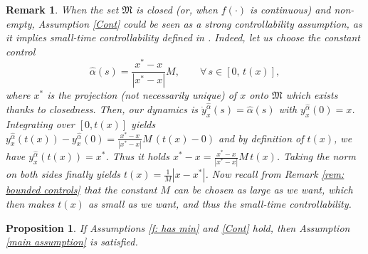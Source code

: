 \documentclass[12pt]{amsart}
\numberwithin{equation}{section}
\theoremstyle{plain}
\newtheorem{proposition}[theorem]{Proposition}
\newtheorem{remark}[theorem]{Remark}
\begin{document}
\begin{remark}\label{rem: stc}
When the set $\mathfrak{M}$ is closed (or, when $f(\cdot)$ is continuous) and non-empty, 
Assumption \ref{Cont} could be seen as a strong controllability assumption, as it implies \textit{small-time controllability} defined in \cite[Definition IV.1.1]{bardi1997optimal}. Indeed, let us choose the constant control  
\begin{equation}\label{alpha hat}
    \hat{\alpha}(s) = \frac{x^{*} - x}{|x^{*} - x|}M, \quad \quad \forall\, s\in [0, \, t(x)],
\end{equation}
where $x^{*}$ is the projection (not necessarily unique) of $x$ onto $\mathfrak{M}$ which exists thanks to closedness. Then, our dynamics is $\dot{y}_{x}^{\hat{\alpha}}(s) = \hat{\alpha}(s)$ with $y_{x}^{\hat{\alpha}}(0)=x$. Integrating over $[0,t(x)]$ yields $y_{x}^{\hat{\alpha}}(t(x)) - y_{x}^{\hat{\alpha}}(0) = \frac{x^{*} - x}{|x^{*} - x|}M \, (t(x)-0)$ and by definition of $t(x)$, we have $y_{x}^{\hat{\alpha}}(t(x)) = x^{*}$. Thus it holds $x^{*} -x = \frac{x^{*} -x}{|x^{*} - x|}M\, t(x)$. Taking the norm on both sides finally yields $t(x) = \frac{1}{M}|x-x^{*}|$. 
Now recall from Remark \ref{rem: bounded controls} that the constant $M$ can be chosen as large as we want, which then makes $t(x)$ as small as we want, and thus the \textit{small-time controllability}. 
\end{remark}


\begin{proposition}\label{prop: cont gaits}
If Assumptions \ref{f: has min} and \ref{Cont} hold, then Assumption \ref{main assumption} is satisfied. 
\end{proposition}
\end{document}
